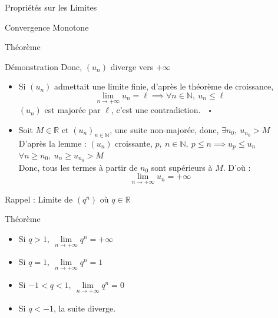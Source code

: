 \documentclass{coursbook}
\begin{document}
\begin{Gpartie}{Propriétés sur les Limites}
\begin{Spartie}{Convergence Monotone}
\begin{SSpartie}{Théorème}
\begin{SSSpartie}{Démonstration}
                    Donc, $(u_n)$ diverge vers $+\infty$
                    \begin{itemize}
                        \item Si $(u_n)$ admettait une limite finie, d'après le théorème de croissance, 
                        \[\lim\limits_{n\to +\infty}u_n=\ell\implies\forall n\in\mathbb{N},\ u_n\leq\ell\] $(u_n)$ est majorée par $\ell$, c'est une contradiction.$\quad\square$
                        \\[2ex]
                        \item Soit $M\in\mathbb{R}$ et $(u_n)_{n\in\mathbb{N}}$, une suite non-majorée, donc, $\exists n_0,\ u_{n_0}>M$ \\ D'après la lemme : $(u_n)$ croissante, $p,\ n\in\mathbb{N},\ p\leq n\implies u_p\leq u_n$ \\ $\forall n\geq n_0,\ u_n\geq u_{n_0}>M$ \\ Donc, tous les termes à partir de $n_0$ sont supérieurs à $M$. D'où : \[\lim\limits_{n\to +\infty}u_n=+\infty\]
                    \end{itemize}
                \end{SSSpartie}
            \end{SSpartie}
        \end{Spartie}
        \begin{Spartie}{Rappel : Limite de $\left(q^n\right)$ où $q\in\mathbb{R}$} 
            \begin{SSpartie}{Théorème} 
                \begin{itemize}
                    \setlength\itemsep{0.5em}
                    \item Si $q>1,~\lim\limits_{n\to+\infty}q^n=+\infty$
                    \item Si $q=1,~\lim\limits_{n\to+\infty}q^n=1$
                    \item Si $-1<q<1,~\lim\limits_{n\to+\infty}q^n=0$
                    \item Si $q<-1$, la suite diverge.
                \end{itemize}
            \end{SSpartie}
        \end{Spartie}
    \end{Gpartie}
    \pagebreak
\end{document}
